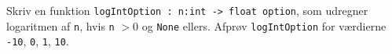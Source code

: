 \label{logIntOption} Skriv en funktion \lstinline{logIntOption : n:int -> float option}, som udregner logaritmen af \lstinline{n}, hvis \lstinline{n} $>0$ og \lstinline{None} ellers. Afprøv \lstinline{logIntOption} for værdierne \lstinline{-10}, \lstinline{0}, \lstinline{1}, \lstinline{10}.